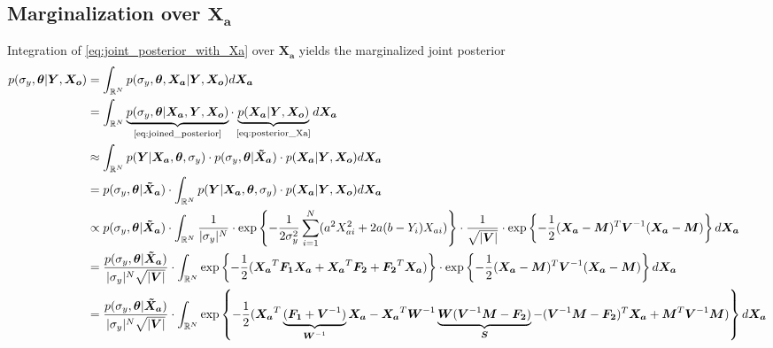 \documentclass[10pt]{article}
\renewcommand{\vec}[1]{\boldsymbol{#1}}
\newcommand{\mat}[1]{\boldsymbol{#1}}
\begin{document}
\subsection{Marginalization over $\vec{X_a}$}
Integration of \cref{eq:joint_posterior_with_Xa} over $\vec{X_a}$ yields the marginalized joint posterior
{\tiny
\begin{align}
    p(\sigma_y, \vec{\theta} | \vec{Y}, \vec{X_o}) &= \int_{\mathbb{R}^N} p(\sigma_y, \vec{\theta}, \vec{X_a} | \vec{Y}, \vec{X_o}) d\vec{X_a} \\
    
    &= \int_{\mathbb{R}^N} 
        \underbrace{p(\sigma_y, \vec{\theta} | \vec{X_a}, \vec{Y}, \vec{X_o})}_{\text{\cref{eq:joined_posterior}}} \cdot 
        \underbrace{p(\vec{X_a} | \vec{Y}, \vec{X_o})}_{\text{\cref{eq:posterior_Xa}}} d\vec{X_a} \\
    
    &\approx \int_{\mathbb{R}^N} 
        p(\vec{Y} | \vec{X_a}, \vec{\theta}, \sigma_y) \cdot 
        p(\sigma_y, \vec{\theta} | \vec{\tilde{X}_a}) \cdot 
        p(\vec{X_a} | \vec{Y}, \vec{X_o}) d\vec{X_a} \\
    
    &= p(\sigma_y, \vec{\theta} | \vec{\tilde{X}_a}) \cdot 
    \int_{\mathbb{R}^N} 
        p(\vec{Y} | \vec{X_a}, \vec{\theta}, \sigma_y) \cdot 
        p(\vec{X_a} | \vec{Y}, \vec{X_o}) d\vec{X_a} \\
        
    &\propto p(\sigma_y, \vec{\theta} | \vec{\tilde{X}_a}) \cdot 
    \int_{\mathbb{R}^N} 
        \frac{1}{|\sigma_y|^N} \cdot 
        \exp\left\{- \frac{1}{2\sigma_y^2} \sum_{i=1}^N (a^2 X_{ai}^2  + 2 a (b - Y_i) X_{ai} ) \right\} \cdot 
        \frac{1}{\sqrt{|\mat{V}|}} \cdot
        \exp\left\{- \frac{1}{2} (\vec{X_a} - \vec{M})^T \mat{V}^{-1} (\vec{X_a} - \vec{M}) \right\} d\vec{X_a} \\
        
    &= \frac{p(\sigma_y, \vec{\theta} | \vec{\tilde{X}_a})}{|\sigma_y|^N \sqrt{|\mat{V}|}} \cdot 
    \int_{\mathbb{R}^N} 
        \exp\left\{- \frac{1}{2} (\vec{X_a}^T \mat{F_1} \vec{X_a} + \vec{X_a}^T \vec{F_2} + \vec{F_2}^T \vec{X_a}) \right\} \cdot 
        \exp\left\{- \frac{1}{2} (\vec{X_a} - \vec{M})^T \mat{V}^{-1} (\vec{X_a} - \vec{M}) \right\} d\vec{X_a} \\
        
    &= \frac{p(\sigma_y, \vec{\theta} | \vec{\tilde{X}_a})}{|\sigma_y|^N \sqrt{|\mat{V}|}} \cdot 
    \int_{\mathbb{R}^N} 
        \exp\left\{- \frac{1}{2} (\vec{X_a}^T \underbrace{(\mat{F_1} + \mat{V}^{-1})}_{\mat{W}^{-1}} \vec{X_a} - \vec{X_a}^T \mat{W}^{-1} \underbrace{\mat{W} (\mat{V}^{-1} \vec{M} - \vec{F_2})}_{\vec{S}} - (\mat{V}^{-1} \vec{M} - \vec{F_2})^T \vec{X_a} + \vec{M}^T \mat{V}^{-1} \vec{M})  \right\} d\vec{X_a} \\


\end{align}}
\end{document}
